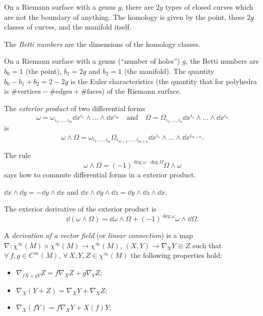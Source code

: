 \documentclass[a4paper,12pt]{book}
\begin{document}
\begin{example}
On a Riemann surface with a genus $g$, there are $2g$ types of closed curves which are not the boundary of anything. The homology is given by the point, these $2g$ classes of curves, and the manifold itself.
\end{example}

\begin{definition}
The \emph{Betti numbers} are the dimensions of the homology classes.
\end{definition}

\begin{example}
On a Riemann surface with a genus (``number of holes'') $g$, the Betti numbers are $b_0=1$ (the point), $b_1=2g$ and $b_2=1$ (the manifold). The quantity $b_0-b_1+b_2=2-2g$ is the Euler characteristics (the quantity that for polyhedra is $\text{\#vertices}-\text{\#edges}+\text{\#faces}$) of the Riemann surface.
\end{example}

\begin{definition}
The \emph{exterior product} of two differential forms
\[\omega=\omega_{i_1,\ldots,i_m}\dd x^{i_1}\wedge\ldots\wedge\dd x^{i_m}\quad\text{and}\quad\Omega=\Omega_{i_1,\ldots,i_n}\dd x^{i_1}\wedge\ldots\wedge\dd x^{i_n}\]
is
\[\omega\wedge\Omega=\omega_{i_1,\ldots,i_m}\Omega_{i_{m+1},\ldots,i_{m+n}}\dd x^{i_1}\wedge\ldots\wedge\dd x^{i_{m+n}}.\]
\end{definition}

The rule
\[\omega\wedge\Omega=(-1)^{\deg\omega\cdot\deg\Omega}\Omega\wedge\omega\]
says how to commute differential forms in a exterior product.

\begin{example}
$\dd x\wedge\dd y=-\dd y\wedge\dd x$ and $\dd x\wedge\dd y\wedge\dd z=\dd y\wedge\dd z\wedge\dd x$.
\end{example}

\begin{exercise}
The exterior derivative of the exterior product is
\[\dd(\omega\wedge\Omega)=\dd\omega\wedge\Omega+(-1)^{\deg\omega}\omega\wedge\dd\Omega.\]
\end{exercise}

\begin{definition}
A \emph{derivation of a vector field} (or \emph{linear connection}) is a map $\nabla\colon \chi^\infty(M)\times\chi^\infty(M)\to\chi^\infty(M)$, $(X,Y)\to\nabla_XY\equiv Z$ such that $\forall\, f,g\in C^\infty(M)$, $\forall\,X,Y,Z\in\chi^\infty(M)$ the following properties hold:
\begin{itemize}
\item $\nabla_{fX+gY}Z=f\nabla_XZ+g\nabla_YZ$;
\item $\nabla_X(Y+Z)=\nabla_XY+\nabla_XZ$;
\item $\nabla_X(fY)=f\nabla_XY+X(f)Y$;
\end{itemize}
\end{definition}
\end{document}

